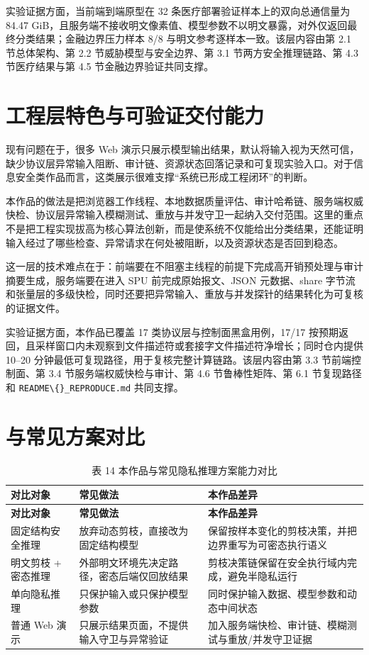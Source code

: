 实验证据方面，当前端到端原型在 32 条医疗部署验证样本上的双向总通信量为 84.47 GiB，且服务端不接收明文像素值、模型参数不以明文暴露，对外仅返回最终分类结果；金融边界压力样本 8/8 与明文参考逐样本一致。该层内容由第 2.1 节总体架构、第 2.2 节威胁模型与安全边界、第 3.1 节两方安全推理链路、第 4.3 节医疗结果与第 4.5 节金融边界验证共同支撑。

\section{工程层特色与可验证交付能力}

现有问题在于，很多 Web 演示只展示模型输出结果，默认将输入视为天然可信，缺少协议层异常输入阻断、审计链、资源状态回落记录和可复现实验入口。对于信息安全类作品而言，这类展示很难支撑“系统已形成工程闭环”的判断。

本作品的做法是把浏览器工作线程、本地数据质量评估、审计哈希链、服务端权威快检、协议层异常输入模糊测试、重放与并发守卫一起纳入交付范围。这里的重点不是把工程实现拔高为核心算法创新，而是使系统不仅能给出分类结果，还能证明输入经过了哪些检查、异常请求在何处被阻断，以及资源状态是否回到稳态。

这一层的技术难点在于：前端要在不阻塞主线程的前提下完成高开销预处理与审计摘要生成，服务端要在进入 SPU 前完成原始报文、JSON 元数据、share 字节流和张量层的多级快检，同时还要把异常输入、重放与并发探针的结果转化为可复核的证据文件。

实验证据方面，本作品已覆盖 17 类协议层与控制面黑盒用例，17/17 按预期返回，且采样窗口内未观察到文件描述符或套接字文件描述符净增长；同时仓内提供 10–20 分钟最低可复现路径，用于复核完整计算链路。该层内容由第 3.3 节前端控制面、第 3.4 节服务端权威快检与审计、第 4.6 节鲁棒性矩阵、第 6.1 节复现路径和 \texttt{README\textbackslash\{\}\_REPRODUCE.md} 共同支撑。

\section{与常见方案对比}

\begin{longtable}{>{\raggedright\arraybackslash}p{}>{\raggedright\arraybackslash}p{}>{\raggedright\arraybackslash}p{}}
\caption{表 14 本作品与常见隐私推理方案能力对比}\\
\toprule
\textbf{对比对象} & \textbf{常见做法} & \textbf{本作品差异} \\
\midrule
\endfirsthead
\toprule
\textbf{对比对象} & \textbf{常见做法} & \textbf{本作品差异} \\
\midrule
\endhead
固定结构安全推理 & 放弃动态剪枝，直接改为固定结构模型 & 保留按样本变化的剪枝决策，并把边界重写为可密态执行语义 \\
明文剪枝 + 密态推理 & 外部明文环境先决定路径，密态后端仅回放结果 & 剪枝决策链保留在安全执行域内完成，避免半隐私运行 \\
单向隐私推理 & 只保护输入或只保护模型参数 & 同时保护输入数据、模型参数和动态中间状态 \\
普通 Web 演示 & 只展示结果页面，不提供输入守卫与异常验证 & 加入服务端快检、审计链、模糊测试与重放/并发守卫证据 \\
\bottomrule
\end{longtable}

